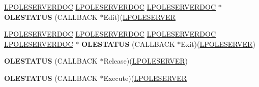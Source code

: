 \begin{DoxyCompactItemize}
\item 
\mbox{\label{struct___o_l_e_s_e_r_v_e_r_v_t_b_l_a5491437fb44033635cff46a1431d795f}} 
\hyperlink{struct___o_l_e_s_e_r_v_e_r_d_o_c}{L\+P\+O\+L\+E\+S\+E\+R\+V\+E\+R\+D\+OC} \hyperlink{struct___o_l_e_s_e_r_v_e_r_d_o_c}{L\+P\+O\+L\+E\+S\+E\+R\+V\+E\+R\+D\+OC} \hyperlink{struct___o_l_e_s_e_r_v_e_r_d_o_c}{L\+P\+O\+L\+E\+S\+E\+R\+V\+E\+R\+D\+OC} $\ast$ {\bfseries O\+L\+E\+S\+T\+A\+T\+US} (C\+A\+L\+L\+B\+A\+CK $\ast$Edit)(\hyperlink{struct___o_l_e_s_e_r_v_e_r}{L\+P\+O\+L\+E\+S\+E\+R\+V\+ER}
\item 
\mbox{\label{struct___o_l_e_s_e_r_v_e_r_v_t_b_l_ac25097a50d16761e3758f99b7aeaf313}} 
\hyperlink{struct___o_l_e_s_e_r_v_e_r_d_o_c}{L\+P\+O\+L\+E\+S\+E\+R\+V\+E\+R\+D\+OC} \hyperlink{struct___o_l_e_s_e_r_v_e_r_d_o_c}{L\+P\+O\+L\+E\+S\+E\+R\+V\+E\+R\+D\+OC} \hyperlink{struct___o_l_e_s_e_r_v_e_r_d_o_c}{L\+P\+O\+L\+E\+S\+E\+R\+V\+E\+R\+D\+OC} \hyperlink{struct___o_l_e_s_e_r_v_e_r_d_o_c}{L\+P\+O\+L\+E\+S\+E\+R\+V\+E\+R\+D\+OC} $\ast$ {\bfseries O\+L\+E\+S\+T\+A\+T\+US} (C\+A\+L\+L\+B\+A\+CK $\ast$Exit)(\hyperlink{struct___o_l_e_s_e_r_v_e_r}{L\+P\+O\+L\+E\+S\+E\+R\+V\+ER})
\item 
\mbox{\label{struct___o_l_e_s_e_r_v_e_r_v_t_b_l_a3ad7475e702067b4e424e35ae1b14004}} 
{\bfseries O\+L\+E\+S\+T\+A\+T\+US} (C\+A\+L\+L\+B\+A\+CK $\ast$Release)(\hyperlink{struct___o_l_e_s_e_r_v_e_r}{L\+P\+O\+L\+E\+S\+E\+R\+V\+ER})
\item 
\mbox{\label{struct___o_l_e_s_e_r_v_e_r_v_t_b_l_a2c9468e2dcfb89c0fcdbfb7621e72462}} 
{\bfseries O\+L\+E\+S\+T\+A\+T\+US} (C\+A\+L\+L\+B\+A\+CK $\ast$Execute)(\hyperlink{struct___o_l_e_s_e_r_v_e_r}{L\+P\+O\+L\+E\+S\+E\+R\+V\+ER}
\end{DoxyCompactItemize}
